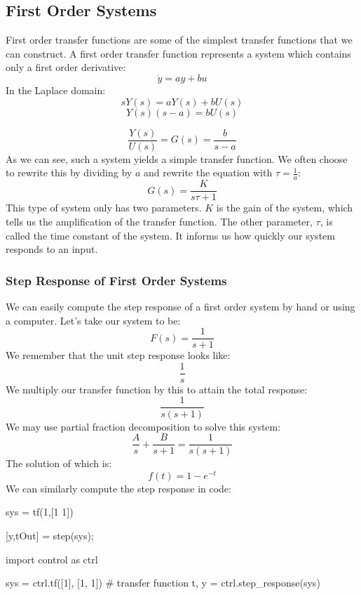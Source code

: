 \subsection{First Order Systems}
First order transfer functions are some of the simplest transfer functions that we can construct. A first order transfer function represents a system which contains only a first order derivative:
$$\dot{y}=ay+bu$$
In the Laplace domain:
$$sY(s)=aY(s)+bU(s)$$
$$Y(s)(s-a)=bU(s)$$

$$\frac{Y(s)}{U(s)}=G(s)=\frac{b}{s-a}$$
As we can see, such a system yields a simple transfer function. We often choose to rewrite this by dividing by $a$ and rewrite the equation with $\tau=\frac{1}{a}$:
$$G(s)=\frac{K}{s\tau+1}$$
This type of system only has two parameters. $K$ is the gain of the system, which tells us the amplification of the transfer function. The other parameter, $\tau$, is called the time constant of the system. It informs us how quickly our system responds to an input.

\subsubsection{Step Response of First Order Systems}

We can easily compute the step response of a first order system by hand or using a computer. Let's take our system to be:
$$F(s)=\frac{1}{s+1}$$
We remember that the unit step response looks like:
$$\frac{1}{s}$$
We multiply our transfer function by this to attain the total response:
$$\frac{1}{s(s+1)}$$
We may use partial fraction decomposition to solve this system:
$$\frac{A}{s}+\frac{B}{s+1}=\frac{1}{s(s+1)}$$
The solution of which is:
$$f(t)=1-e^{-t}$$
We can similarly compute the step response in code:
\begin{matlabscript}{}
sys = tf(1,[1 1]) %

[y,tOut] = step(sys);
\end{matlabscript}
\begin{pythonscript}{}
import control as ctrl

sys = ctrl.tf([1], [1, 1])  # transfer function
t, y = ctrl.step_response(sys)
\end{pythonscript}

